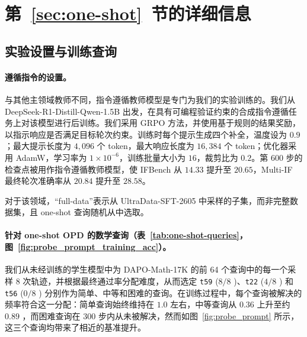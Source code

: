 \section{第~\ref{sec:one-shot}~节的详细信息}

\subsection{实验设置与训练查询}
\label{app:model-data}

\paragraph{遵循指令的设置。}
\label{app:IF-setup}
与其他主领域教师不同，指令遵循教师模型是专门为我们的实验训练的。我们从 DeepSeek-R1-Distill-Qwen-1.5B 出发，在具有可编程验证约束的合成指令遵循任务上对该模型进行后训练。我们采用 GRPO 方法，并使用基于规则的结果奖励，以指示响应是否满足目标轮次约束。训练时每个提示生成四个补全，温度设为 \(0.9\)；最大提示长度为 \(4{,}096\) 个 token，最大响应长度为 \(16{,}384\) 个 token；优化器采用 AdamW，学习率为 \(1\times10^{-6}\)，训练批量大小为 \(16\)，裁剪比为 \(0.2\)。第 600 步的检查点被用作指令遵循教师模型，使 IFBench \citep{pyatkin2026generalizing} 从 \(14.33\) 提升至 \(20.65\)，Multi-IF 最终轮次准确率从 \(20.84\) 提升至 \(28.58\)。

对于该领域，“full-data”表示从 UltraData-SFT-2605 \citep{ultradata-sft-2605} 中采样的子集，而非完整数据集，且 one-shot 查询随机从中选取。


\paragraph{针对 one-shot OPD 的数学查询（表~\ref{tab:one-shot-queries}，图~\ref{fig:probe_prompt_training_acc}）。}
\label{app:training-accuracy}
我们从未经训练的学生模型中为 DAPO-Math-17K 的前 64 个查询中的每一个采样 8 次轨迹，并根据最终通过率分配难度，从而选定 \texttt{t59} (\(8/8\) )、\texttt{t22} (\(4/8\) ) 和 \texttt{t56} (\(0/8\) ) 分别作为简单、中等和困难的查询。在训练过程中，每个查询被解决的频率符合这一分配：简单查询始终维持在 \(1.0\) 左右，中等查询从 \(0.36\) 上升至约 \(0.89\) ，而困难查询在 \(300\) 步内从未被解决，然而如图~\ref{fig:probe_prompt} 所示，这三个查询均带来了相近的基准提升。

